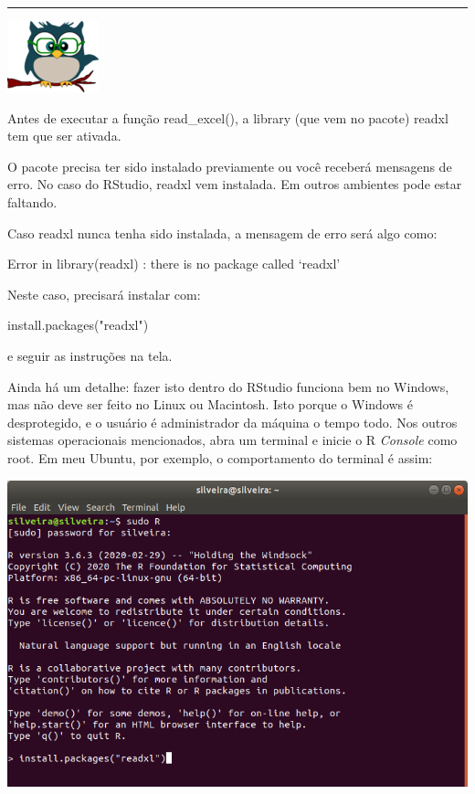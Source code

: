 \documentclass[
]{article}
\newenvironment{Shaded}{\begin{snugshade}}{\end{snugshade}}
\newcommand{\FunctionTok}[1]{\textcolor[rgb]{0.00,0.00,0.00}{#1}}
\newcommand{\NormalTok}[1]{#1}
\newcommand{\StringTok}[1]{\textcolor[rgb]{0.31,0.60,0.02}{#1}}
\begin{document}
\begin{center}\rule{0.5\linewidth}{0.5pt}\end{center}

\begin{flushleft}\includegraphics[width=0.08\linewidth]{coruja} \end{flushleft}

Antes de executar a função read\_excel(), a library (que vem no pacote)
readxl tem que ser ativada.

O pacote precisa ter sido instalado previamente ou você receberá
mensagens de erro. No caso do RStudio, readxl vem instalada. Em outros
ambientes pode estar faltando.

Caso readxl nunca tenha sido instalada, a mensagem de erro será algo
como:

{Error in library(readxl) : there is no package called `readxl'}

Neste caso, precisará instalar com:

\begin{Shaded}
\begin{Highlighting}[]
\FunctionTok{install.packages}\NormalTok{(}\StringTok{"readxl"}\NormalTok{)}
\end{Highlighting}
\end{Shaded}

e seguir as instruções na tela.

Ainda há um detalhe: fazer isto dentro do RStudio funciona bem no
Windows, mas não deve ser feito no Linux ou Macintosh. Isto porque o
Windows é desprotegido, e o usuário é administrador da máquina o tempo
todo. Nos outros sistemas operacionais mencionados, abra um terminal e
inicie o R \emph{Console} como root. Em meu Ubuntu, por exemplo, o
comportamento do terminal é assim:

\begin{center}\includegraphics[width=0.9\linewidth]{R_installpackage} \end{center}
\end{document}
